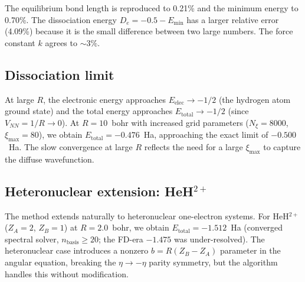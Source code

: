 \documentclass[aps,pra,twocolumn,superscriptaddress,longbibliography]{revtex4-2}
\begin{document}
The equilibrium bond length is reproduced to 0.21\% and the minimum
energy to 0.70\%.  The dissociation energy $D_e = -0.5 - E_{\min}$
has a larger relative error (4.09\%) because it is the small
difference between two large numbers.  The force constant $k$
agrees to $\sim 3\%$.

\subsection{Dissociation limit}

At large $R$, the electronic energy approaches $E_{\mathrm{elec}}
\to -1/2$ (the hydrogen atom ground state) and the total energy
approaches $E_{\mathrm{total}} \to -1/2$ (since $V_{NN} = 1/R
\to 0$).  At $R = 10$~bohr with increased grid parameters
($N_\xi = 8000$, $\xi_{\max} = 80$), we obtain $E_{\mathrm{total}}
= -0.476$~Ha, approaching the exact limit of $-0.500$~Ha.  The
slow convergence at large $R$ reflects the need for a large
$\xi_{\max}$ to capture the diffuse wavefunction.

\subsection{Heteronuclear extension: \texorpdfstring{HeH$^{2+}$}{HeH2+}}

The method extends naturally to heteronuclear one-electron systems.
For HeH$^{2+}$ ($Z_A = 2$, $Z_B = 1$) at $R = 2.0$~bohr, we
obtain $E_{\mathrm{total}} = -1.512$~Ha (converged spectral solver,
$n_{\mathrm{basis}} \ge 20$; the FD-era $-1.475$ was under-resolved).  The heteronuclear case
introduces a nonzero $b = R(Z_B - Z_A)$ parameter in the angular
equation, breaking the $\eta \to -\eta$ parity symmetry, but the
algorithm handles this without modification.
\end{document}
